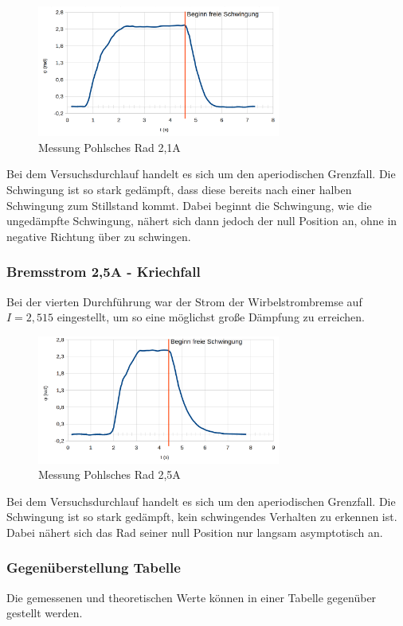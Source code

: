 \documentclass[a4paper]{scrartcl}
\numberwithin{equation}{subsection}
\begin{document}
\begin{figure}[H]
\includegraphics[width=8cm]{Messung_Rad_graph_21A}
\centering
\caption{Messung Pohlsches Rad 2,1A}
\centering
\end{figure}

Bei dem Versuchsdurchlauf handelt es sich um den aperiodischen Grenzfall. Die Schwingung ist so stark gedämpft, dass diese bereits nach einer halben Schwingung zum Stillstand kommt. Dabei beginnt die Schwingung, wie die ungedämpfte Schwingung, nähert sich dann jedoch der null Position an, ohne in negative Richtung über zu schwingen. 

\subsubsection{Bremsstrom 2,5A - Kriechfall}
Bei der vierten Durchführung war der Strom der Wirbelstrombremse auf $I = 2,515$ eingestellt, um so eine möglichst große Dämpfung zu erreichen.

\begin{figure}[H]
\includegraphics[width=8cm]{Messung_Rad_graph_25A}
\centering
\caption{Messung Pohlsches Rad 2,5A}
\centering
\end{figure}

Bei dem Versuchsdurchlauf handelt es sich um den aperiodischen Grenzfall. Die Schwingung ist so stark gedämpft, kein schwingendes Verhalten zu erkennen ist. Dabei nähert sich das Rad seiner null Position nur langsam asymptotisch an. 

\subsubsection{Gegenüberstellung Tabelle}
Die gemessenen und theoretischen Werte können in einer Tabelle gegenüber gestellt werden.
\end{document}
